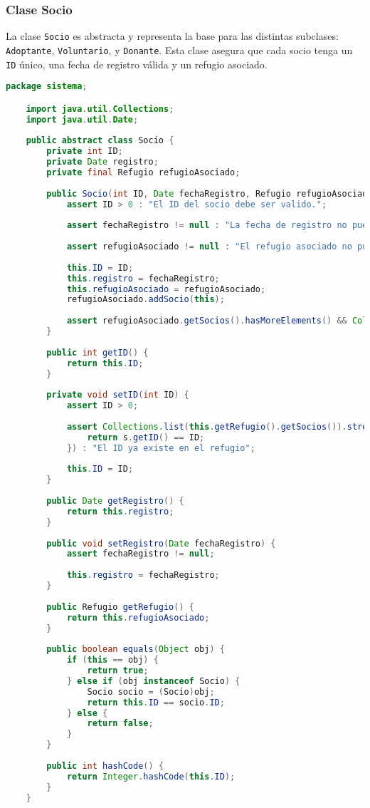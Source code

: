 \subsubsection{Clase Socio}\label{codigo:socio}
La clase \texttt{Socio} es abstracta y representa la base para las distintas subclases: 
\texttt{Adoptante}, \texttt{Voluntario}, y \texttt{Donante}. Esta clase asegura que 
cada socio tenga un \texttt{ID} único, una fecha de registro válida y un refugio asociado.

\begin{lstlisting}[style = javaNormal, language=Java] 
    package sistema;

    import java.util.Collections;
    import java.util.Date;
    
    public abstract class Socio {
        private int ID;
        private Date registro;
        private final Refugio refugioAsociado;
    
        public Socio(int ID, Date fechaRegistro, Refugio refugioAsociado) {
            assert ID > 0 : "El ID del socio debe ser valido.";
    
            assert fechaRegistro != null : "La fecha de registro no puede ser nula.";
    
            assert refugioAsociado != null : "El refugio asociado no puede ser nulo.";
    
            this.ID = ID;
            this.registro = fechaRegistro;
            this.refugioAsociado = refugioAsociado;
            refugioAsociado.addSocio(this);
    
            assert refugioAsociado.getSocios().hasMoreElements() && Collections.list(refugioAsociado.getSocios()).contains(this);
        }
    
        public int getID() {
            return this.ID;
        }
    
        private void setID(int ID) {
            assert ID > 0;
    
            assert Collections.list(this.getRefugio().getSocios()).stream().noneMatch((s) -> {
                return s.getID() == ID;
            }) : "El ID ya existe en el refugio";
    
            this.ID = ID;
        }
    
        public Date getRegistro() {
            return this.registro;
        }
    
        public void setRegistro(Date fechaRegistro) {
            assert fechaRegistro != null;
    
            this.registro = fechaRegistro;
        }
    
        public Refugio getRefugio() {
            return this.refugioAsociado;
        }
    
        public boolean equals(Object obj) {
            if (this == obj) {
                return true;
            } else if (obj instanceof Socio) {
                Socio socio = (Socio)obj;
                return this.ID == socio.ID;
            } else {
                return false;
            }
        }
    
        public int hashCode() {
            return Integer.hashCode(this.ID);
        }
    }
\end{lstlisting}
